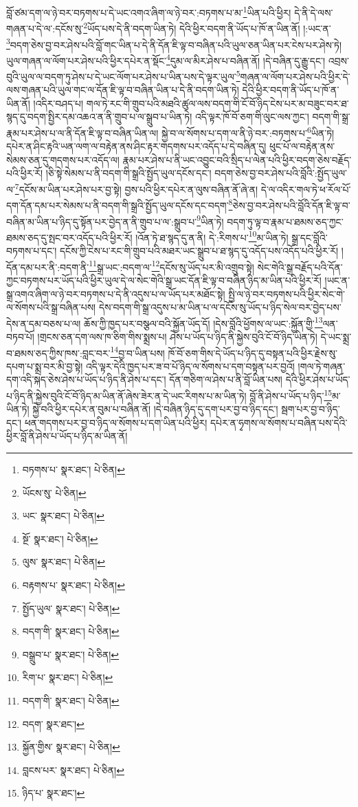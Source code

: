 བློ་ཙམ་དག་ལ་ཉེ་བར་བཏགས་པ་དེ་ཡང་འགའ་ཞིག་ལ་ཉེ་བར་:བཏགས་པ་མ་\footnote{བཏགས་པ་  སྣར་ཐང་།  པེ་ཅིན། }ཡིན་པའི་ཕྱིར། དེ་ནི་དེ་ལས་གཞན་པ་དེ་ལ་:དངོས་སུ་\footnote{ཡོངས་སུ་  པེ་ཅིན། }ཡོད་པས་དེ་ནི་བདག་ཡིན་ཏེ། དེའི་ཕྱིར་བདག་ནི་ཡོད་པ་ཁོ་ན་ཡིན་ནོ། །:ཡང་ན་\footnote{ཡང་  སྣར་ཐང་།  པེ་ཅིན། }བདག་ཅེས་བྱ་བར་ཤེས་པའི་བློ་གང་ཡིན་པ་དེ་ནི་དོན་ཇི་ལྟ་བ་བཞིན་པའི་ཡུལ་ཅན་ཡིན་པར་ངེས་པར་ཤེས་ཏེ། ཡུལ་གཞན་ལ་ལོག་པར་ཤེས་པའི་ཕྱིར་དཔེར་ན་སྡོང་\footnote{སྔོ་  སྣར་ཐང་།  པེ་ཅིན། }དུམ་ལ་མིར་ཤེས་པ་བཞིན་ནོ། །དེ་བཞིན་དུ་རྒྱུ་དང་། འབྲས་བུའི་ཡུལ་ལ་བདག་ཏུ་ཤེས་པ་དེ་ཡང་ལོག་པར་ཤེས་པ་ཡིན་པས་དེ་ལྟར་ཡུལ་\footnote{ལུས་  སྣར་ཐང་།  པེ་ཅིན། }གཞན་ལ་ལོག་པར་ཤེས་པའི་ཕྱིར་དེ་ལས་གཞན་པའི་ཡུལ་གང་ལ་དོན་ཇི་ལྟ་བ་བཞིན་ཡིན་པ་དེ་ནི་བདག་ཡིན་ཏེ། དེའི་ཕྱིར་བདག་ནི་ཡོད་པ་ཁོ་ན་ཡིན་ནོ། །འདིར་བཤད་པ། གལ་ཏེ་རང་གི་གྲུབ་པའི་མཐའི་ཚུལ་ལས་བདག་གི་ངོ་བོ་ཉིད་ངེས་པར་མ་བཟུང་བར་ཐ་སྙད་དུ་བདག་སྤྱིར་དམ་འཆའ་ན་ནི་གྲུབ་པ་ལ་སྒྲུབ་པ་ཡིན་ཏེ། འདི་ལྟར་ཁོ་བོ་ཅག་གི་ལུང་ལས་ཀྱང་། བདག་གི་སྒྲ་རྣམ་པར་ཤེས་པ་ལ་ནི་དོན་ཇི་ལྟ་བ་བཞིན་ཡིན་ལ། སྐྱེ་བ་ལ་སོགས་པ་དག་ལ་ནི་ཉེ་བར་:བཏགས་པ་\footnote{བརྟགས་པ་  སྣར་ཐང་།  པེ་ཅིན། }ཡིན་ཏེ། དཔེར་ན་ཤིང་རྟའི་ཡན་ལག་ལ་བརྟེན་ནས་ཤིང་རྟར་གདགས་པར་འདོད་པ་དེ་བཞིན་དུ། ཕུང་པོ་ལ་བརྟེན་ནས་སེམས་ཅན་དུ་གདགས་པར་འདོད་ལ། རྣམ་པར་ཤེས་པ་ནི་ཡང་འབྱུང་བའི་སྲིད་པ་ལེན་པའི་ཕྱིར་བདག་ཅེས་བརྗོད་པའི་ཕྱིར་རོ། །ཅི་སྟེ་སེམས་པ་ནི་བདག་གི་སྒྲའི་སྤྱོད་ཡུལ་དངོས་དང་། བདག་ཅེས་བྱ་བར་ཤེས་པའི་བློའི་:སྤྱོད་ཡུལ་ལ་\footnote{སྤྱོད་ཡུལ་  སྣར་ཐང་།  པེ་ཅིན། }དངོས་མ་ཡིན་པར་ཤེས་པར་བྱ་སྟེ། བྱས་པའི་ཕྱིར་དཔེར་ན་ལུས་བཞིན་ནོ་ཞེ་ན། དེ་ལ་འདིར་གལ་ཏེ་ཕ་རོལ་པོ་དག་དོན་དམ་པར་སེམས་པ་ནི་བདག་གི་སྒྲའི་སྤྱོད་ཡུལ་དངོས་དང་བདག་\footnote{བདག་གི་  སྣར་ཐང་།  པེ་ཅིན། }ཅེས་བྱ་བར་ཤེས་པའི་བློའི་དོན་ཇི་ལྟ་བ་བཞིན་མ་ཡིན་པ་ཉིད་དུ་སྟོན་པར་བྱེད་ན་ནི་གྲུབ་པ་ལ་:སྒྲུབ་པ་\footnote{བསྒྲུབ་པ་  སྣར་ཐང་།  པེ་ཅིན། }ཡིན་ཏེ། བདག་ཏུ་ལྟ་བ་རྣམ་པ་ཐམས་ཅད་ཀྱང་ཐམས་ཅད་དུ་སྤང་བར་འདོད་པའི་ཕྱིར་རོ། །འོན་ཏེ་ཐ་སྙད་དུ་ན་ནི། དེ་:རིགས་པ་\footnote{རིག་པ་  སྣར་ཐང་།  པེ་ཅིན། }མ་ཡིན་ཏེ། སྒྲ་དང་བློའི་བཏགས་པ་དང་། དངོས་ཀྱི་ངེས་པ་རང་གི་གྲུབ་པའི་མཐར་ཡང་སྒྲུབ་པ་ཐ་སྙད་དུ་འདོད་པས་འདོད་པའི་ཕྱིར་རོ། །དོན་དམ་པར་ནི་:བདག་ནི་\footnote{བདག་གི་  སྣར་ཐང་།  པེ་ཅིན། }སྒྲ་ཡང་:བདག་ལ་\footnote{བདག་  སྣར་ཐང་། }དངོས་སུ་ཡོད་པར་མི་འགྲུབ་སྟེ། སེང་གེའི་སྒྲ་བརྗོད་པའི་དོན་ཀྱང་བཏགས་པར་ཡོད་པའི་ཕྱིར་ཡུལ་དེ་ལ་སེང་གེའི་སྒྲ་ཡང་དོན་ཇི་ལྟ་བ་བཞིན་ཉིད་མ་ཡིན་པའི་ཕྱིར་རོ། །ཡང་ན་སྒྲ་འགའ་ཞིག་ལ་ཉེ་བར་བཏགས་པ་དེ་ནི་འདུས་པ་ལ་ཡོད་པར་མཐོང་སྟེ། སྤྱི་ལ་ཉེ་བར་བཏགས་པའི་ཕྱིར་སེང་གེ་ལ་སོགས་པའི་སྒྲ་བཞིན་པས། དེས་བདག་གི་སྒྲ་འདུས་པ་མ་ཡིན་པ་ལ་དངོས་སུ་ཡོད་པ་ཉིད་སེལ་བར་བྱེད་པས་དེས་ན་དམ་བཅས་པ་ལ། ཆོས་ཀྱི་ཁྱད་པར་བསྩལ་བའི་སྐྱོན་ཡོད་དོ། །དེས་བློའི་ཕྱོགས་ལ་ཡང་:སྐྱོན་གྱི་\footnote{སྐྱོན་གྱིས་  སྣར་ཐང་།  པེ་ཅིན། }ལན་བཏབ་པོ། །གྲངས་ཅན་དག་ལས་ཁ་ཅིག་གིས་སྨྲས་པ། ཤེས་པ་ཡོད་པ་ཉིད་ནི་སྐྱེས་བུའི་ངོ་བོ་ཉིད་ཡིན་ཏེ། དེ་ཡང་སྨྲ་བ་ཐམས་ཅད་ཀྱིས་ཁས་:བླང་བར་\footnote{བླངས་པར་  སྣར་ཐང་།  པེ་ཅིན། }བྱ་བ་ཡིན་པས། ཁོ་བོ་ཅག་གིས་དེ་ཡོད་པ་ཉིད་དུ་བསྟན་པའི་ཕྱིར་རྗེས་སུ་དཔག་པ་སྨྲ་བར་མི་བྱ་སྟེ། འདི་ལྟར་དེའི་ཁྱད་པར་ཟ་བ་པོ་ཉིད་ལ་སོགས་པ་དག་བསྟན་པར་བྱའོ། །གལ་ཏེ་གཞན་དག་འདི་སྐད་ཅེས་ཤེས་པ་ཡོད་པ་ཉིད་ནི་ཤེས་པ་དང་། དོན་གཅིག་ལ་ཤེས་པ་ནི་བློ་ཡིན་པས། དེའི་ཕྱིར་ཤེས་པ་ཡོད་པ་ཉིད་ནི་སྐྱེས་བུའི་ངོ་བོ་ཉིད་མ་ཡིན་ནོ་ཞེས་ཟེར་ན་དེ་ཡང་རིགས་པ་མ་ཡིན་ཏེ། བློ་ནི་ཤེས་པ་ཡོད་པ་ཉིད་\footnote{ཉིད་པ་  སྣར་ཐང་། }མ་ཡིན་ཏེ། སྐྱེ་བའི་ཕྱིར་དཔེར་ན་བུམ་པ་བཞིན་ནོ། །དེ་བཞིན་ཉིད་དུ་དག་པར་བྱ་བ་ཉིད་དང་། སྦག་པར་བྱ་བ་ཉིད་དང་། ཕན་གདགས་པར་བྱ་བ་ཉིད་ལ་སོགས་པ་དག་ཡིན་པའི་ཕྱིར། དཔེར་ན་ཧྭགས་ལ་སོགས་པ་བཞིན་པས་དེའི་ཕྱིར་བློ་ནི་ཤེས་པ་ཡོད་པ་ཉིད་མ་ཡིན་ནོ། 